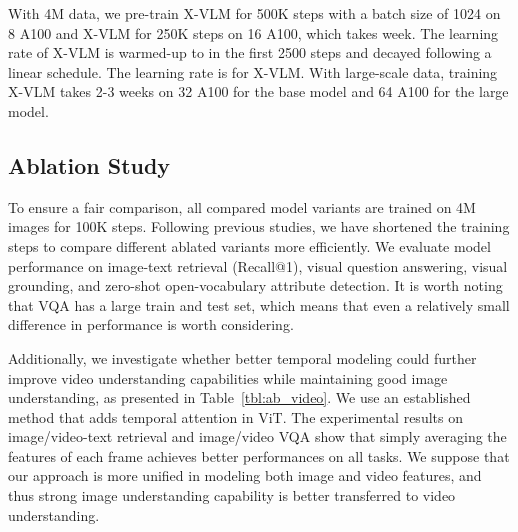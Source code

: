 \documentclass{article}
\newcommand{\baby}{X-VLM\xspace}
\newcommand{\babyB}{X-VLM\xspace}
\newcommand{\babyL}{X-VLM\xspace}
\begin{document}
With 4M data, we pre-train \babyB for 500K steps with a batch size of 1024 on 8 A100 and \babyL for 250K steps on 16 A100, which takes  week. The learning rate of \babyB is warmed-up to  in the first 2500 steps and decayed following a linear schedule. The learning rate is  for \babyL. With large-scale data, training \baby takes 2-3 weeks on 32 A100 for the base model and 64 A100 for the large model. 



\subsection{Ablation Study}
To ensure a fair comparison, all compared model variants are trained on 4M images for 100K steps. Following previous studies, we have shortened the training steps to compare different ablated variants more efficiently. We evaluate model performance on image-text retrieval (Recall@1), visual question answering, visual grounding, and zero-shot open-vocabulary attribute detection. It is worth noting that VQA has a large train and test set, which means that even a relatively small difference in performance is worth considering.



\begin{table}[h]
\centering
{}
\vspace{0.2cm}

\caption{\textbf{Ablation study} of temporal modeling methods. 
}
\label{tbl:ab_video}
\end{table}


Additionally, we investigate whether better temporal modeling could further improve video understanding capabilities while maintaining good image understanding, as presented in Table~\ref{tbl:ab_video}. We use an established method that adds temporal attention in ViT. The experimental results on image/video-text retrieval and image/video VQA show that simply averaging the features of each frame achieves better performances on all tasks. We suppose that our approach is more unified in modeling both image and video features, and thus strong image understanding capability is better transferred to video understanding. 
\end{document}
